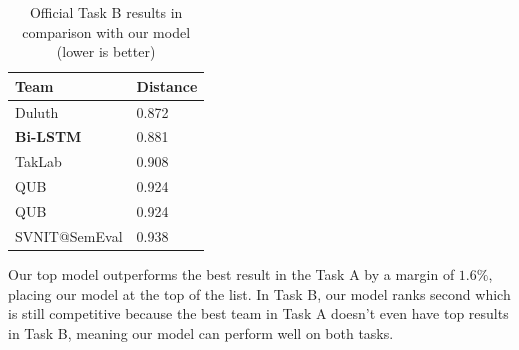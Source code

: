 \documentclass[10pt, a4paper]{article}
\begin{document}
\begin{table}
    \caption{Official Task B results in comparison with our model (lower is
    better)}
 \label{tab:task_b_official}
 \begin{center}
 \begin{tabular}{ll}
 \toprule
     Team & Distance\\
 \midrule
     Duluth & 0.872 \\
     \textbf{Bi-LSTM} & 0.881 \\
     TakLab & 0.908\\
     QUB & 0.924\\
     QUB & 0.924\\
     SVNIT@SemEval & 0.938\\
 \bottomrule
 \end{tabular}
 \end{center}
\end{table}

Our top model outperforms the best result in the Task A by a margin of
$1.6\%$, placing our model at the top of the list. In Task B, our model ranks
second which is still competitive because the best team in Task A doesn't even
have top results in Task B, meaning our model can perform well on both tasks.







\end{document}
